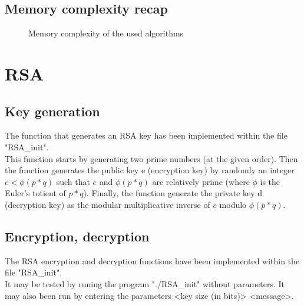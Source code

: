 \documentclass[12pt]{article} %
\begin{document}
\subsection{Memory complexity recap}
    \begin{figure}[!htb]\centering
	\begin{minipage}{0.8\textwidth}  \end{minipage}
	\caption{Memory complexity of the used algorithms}
	\label{memoryComplexity.pgm}
    \end{figure}



\section{RSA}
\subsection{Key generation}
The function that generates an RSA key has been implemented within the file "RSA\_init".\\
This function starts by generating two prime numbers (at the given order).   Then the function generates the public key e (encryption key) by randomly an integer $e < \phi(p*q)$ such that $e$ and $\phi(p*q)$ are relatively prime (where $\phi$ is the Euler's totient of $p*q$).   Finally, the function generate the private key d (decryption key) as the modular multiplicative inverse of $e$ modulo $\phi(p*q)$.

\subsection{Encryption, decryption}
The RSA encryption and decryption functions have been implemented within the file "RSA\_init".\\   It may be tested by runing the program "./RSA\_init" without parameters.  It may also been run by entering the parameters <key size (in bits)> <message>.
\end{document}
